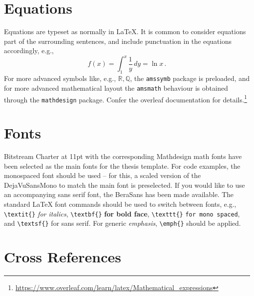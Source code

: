 \section{Equations}

Equations are typeset as normally in \LaTeX{}. It is common to consider equations part of the surrounding sentences, and include punctuation in the equations accordingly, e.g.,
\begin{equation}
    f(x) = \int_1^x \frac{1}{y}\,dy = \ln x\,.
    \label{eq:logarithm}
\end{equation}
For more advanced symbols like, e.g., $\mathbb{R}, \mathbb{Q}$, the \texttt{amssymb} package is preloaded, and for more advanced mathematical layout the \texttt{amsmath} behaviour is obtained through the \texttt{mathdesign} package. Confer the overleaf documentation for details.\footnote{\url{https://www.overleaf.com/learn/latex/Mathematical_expressions}}

\section{Fonts}

Bitstream Charter at 11pt with the corresponding Mathdesign math fonts have been selected as the main fonts for the thesis template. For code examples, the monospaced font should be used – for this, a scaled version of the DejaVuSansMono to match the main font is preselected. If you would like to use an accompanying sans serif font, the BeraSans has been made available. The standard \LaTeX{} font commands should be used to switch between fonts, e.g.,
\texttt{\textbackslash textit\{\}} \textit{for italics},
\texttt{\textbackslash textbf\{\}} \textbf{for bold face},
\texttt{\textbackslash texttt\{\}} \texttt{for mono spaced}, and
\texttt{\textbackslash textsf\{\}} \textsf{for sans serif}.
For generic \emph{emphasis}, \texttt{\textbackslash emph\{\}} should be applied.

\section{Cross References}
\label{sec:crossref}

